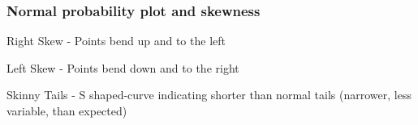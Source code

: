 \documentclass[slidestop,compress,mathserif,12pt,t,professionalfonts,xcolor=table]{beamer}
\begin{document}
\begin{frame}
\frametitle{Normal probability plot and skewness}

{
Right Skew - Points bend up and to the left
}

\pause
{}
{
Left Skew - Points bend down and to the right 
}

\pause
{}
{
Skinny Tails - S shaped-curve indicating shorter than normal tails (narrower, less variable, than expected)
}


\end{frame}
\end{document}
